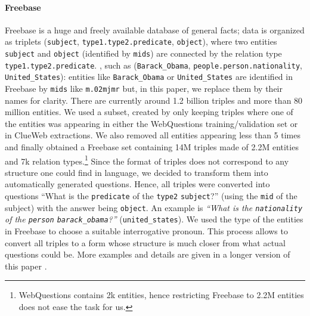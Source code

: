 \documentclass[runningheads,a4paper]{llncs}
\newcommand{\fb}{{\sc Freebase}\xspace}
\newcommand{\wq}{{\sc WebQuestions}\xspace}
\newcommand{\cw}{{\sc ClueWeb}\xspace}
\newcommand{\ent}[1]{{\small {\tt #1}}}
\begin{document}
\paragraph{Freebase}
\fb \cite{bollacker2008freebase} is a huge and freely available
database of general facts; data is organized as triplets
(\ent{subject}, \ent{type1.type2.predicate}, \ent{object}), where two
entities \ent{subject} and \ent{object} (identified by \ent{mids}) are
connected by the relation type \ent{type1.type2.predicate}.
 , such as (\ent{Barack\_Obama},
\ent{people.person.nationality}, \ent{United\_States}): entities like
\ent{Barack\_Obama} or \ent{United\_States} are identified in \fb by
\ent{mids} like \ent{m.02mjmr} but, in this paper, we replace them by
their names for clarity. There are currently around 1.2 billion
triples and more than 80 million entities.  
\fi
We used a subset, created by only keeping
triples where one of the entities was appearing in either the \wq
training/validation set or in  \cw extractions.
We also removed all entities appearing less than 5 times and finally
obtained a \fb set containing 14M triples made of 2.2M entities and 7k
relation types.\footnote{\wq contains 2k entities, hence
  restricting \fb to 2.2M entities does not ease the task for us.}
Since the format of triples does not correspond to any structure one could find in
language, we decided to transform them into automatically generated
questions.  Hence, all triples were converted into questions ``What is
the \ent{predicate} of the \ent{type2} \ent{subject}?'' (using the
\ent{mid} of the subject) with the answer being \ent{object}.  
An example is {\em ``What is the \ent{nationality} of
the \ent{person} \ent{barack\_obama}?''} (\ent{united\_states}). 
We used the type of the
entities in \fb to choose a suitable interrogative pronoun. This
process allows to convert all triples to a form whose structure is
much closer from what actual questions could be.  \fi
More examples and details are given in a longer version of this paper  \cite{DBLP:journals/corr/BordesCW14}.
\end{document}
